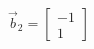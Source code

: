\documentclass[preview]{standalone}
\begin{document}
\begin{align*}
\vec{b}_2 = \begin{bmatrix} -1 \\ 1 \end{bmatrix}
\end{align*}
\end{document}
